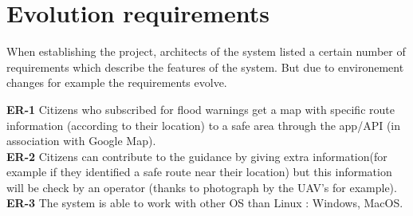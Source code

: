 \section{Evolution requirements}
When establishing the project, architects of the system listed a certain number of requirements which describe the features of the system. But due to environement changes for example the requirements evolve.

\textbf{ER-1} Citizens who subscribed for flood warnings get a map with specific route information (according to their location) to a safe area through the app/API (in association with Google Map). \\

\textbf{ER-2} Citizens can contribute to the guidance by giving extra information(for example if they identified a safe route near their location) but this information will be check by an operator (thanks to photograph by the UAV's for example). \\

\textbf{ER-3} The system is able to work with other OS than Linux : Windows, MacOS.

